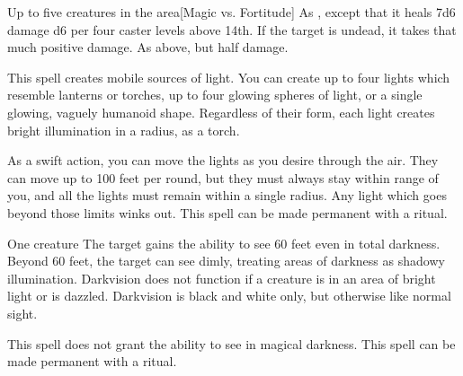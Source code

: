 \begin{spelltargets}{Up to five creatures in the area}[Magic vs. Fortitude]
    \spelleffect As , except that it heals 7d6 damage \add d6 per four caster levels above 14th.
    \spellsuccess If the target is undead, it takes that much positive damage.
    \spellfailure As above, but half damage.
\end{spelltargets}

\begin{comment}
\subsubsection{D}
\end{comment}

\spelldur{\durshort \dismissable}
\spellline
\spelleffect This spell creates mobile sources of light. You can create up to four lights which resemble lanterns or torches, up to four glowing spheres of light, or a single glowing, vaguely humanoid shape. Regardless of their form, each light creates bright illumination in a \areamed radius, as a torch.

As a swift action, you can move the lights as you desire through the air. They can move up to 100 feet per round, but they must always stay within range of you, and all the lights must remain within a single \areamed radius. Any light which goes beyond those limits winks out.
\spellnotes This spell can be made permanent with a  ritual.

\spellrng{\rngtouch}
\spelldur{\durlong}
\begin{spelltarget}{One creature}
    \spelleffect The target gains the ability to see 60 feet even in total darkness. Beyond 60 feet, the target can see dimly, treating areas of darkness as shadowy illumination. Darkvision does not function if a creature is in an area of bright light or is dazzled. Darkvision is black and white only, but otherwise like normal sight.
\end{spelltarget}
\spellnotes This spell does not grant the ability to see in magical darkness. This spell can be made permanent with a  ritual.

